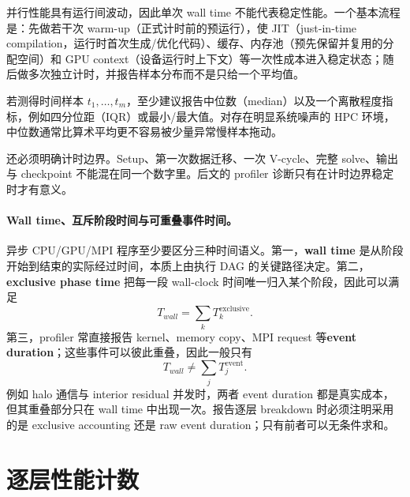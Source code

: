 并行性能具有运行间波动，因此单次 wall time 不能代表稳定性能。一个基本流程是：先做若干次 warm-up（正式计时前的预运行），使 JIT（just-in-time compilation，运行时首次生成/优化代码）、缓存、内存池（预先保留并复用的分配空间）和 GPU context（设备运行时上下文）等一次性成本进入稳定状态；随后做多次独立计时，并报告样本分布而不是只给一个平均值。

若测得时间样本 $t_1,\ldots,t_m$，至少建议报告中位数（median）以及一个离散程度指标，例如四分位距（IQR）或最小/最大值。对存在明显系统噪声的 HPC 环境，中位数通常比算术平均更不容易被少量异常慢样本拖动。

还必须明确计时边界。Setup、第一次数据迁移、一次 V-cycle、完整 solve、输出与 checkpoint 不能混在同一个数字里。后文的 profiler 诊断只有在计时边界稳定时才有意义。

\paragraph{Wall time、互斥阶段时间与可重叠事件时间。}
异步 CPU/GPU/MPI 程序至少要区分三种时间语义。第一，\textbf{wall time} 是从阶段开始到结束的实际经过时间，本质上由执行 DAG 的关键路径决定。第二，\textbf{exclusive phase time} 把每一段 wall-clock 时间唯一归入某个阶段，因此可以满足
\begin{equation}
T_{wall}=\sum_k T_k^{\mathrm{exclusive}}.
\label{eq:benchmark-exclusive-time}
\end{equation}
第三，profiler 常直接报告 kernel、memory copy、MPI request 等\textbf{event duration}；这些事件可以彼此重叠，因此一般只有
\begin{equation}
T_{wall}\neq\sum_j T_j^{\mathrm{event}}.
\label{eq:benchmark-overlap-event-time}
\end{equation}
例如 halo 通信与 interior residual 并发时，两者 event duration 都是真实成本，但其重叠部分只在 wall time 中出现一次。报告逐层 breakdown 时必须注明采用的是 exclusive accounting 还是 raw event duration；只有前者可以无条件求和。

\section{逐层性能计数}

